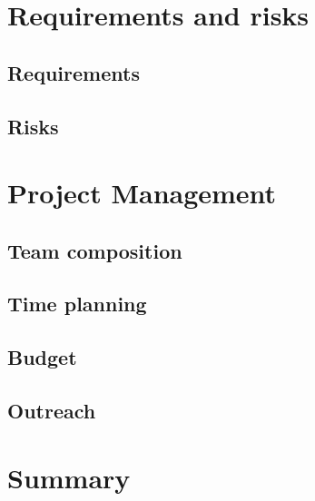 \documentclass[11pt, aspectratio=169]{beamer}
\begin{document}
\section{Requirements and risks}
\subsection{Requirements}
\subsection{Risks}

\section{Project Management}
\subsection{Team composition}
\subsection{Time planning}
\subsection{Budget}
\subsection{Outreach}

\section{Summary}
\end{document}
